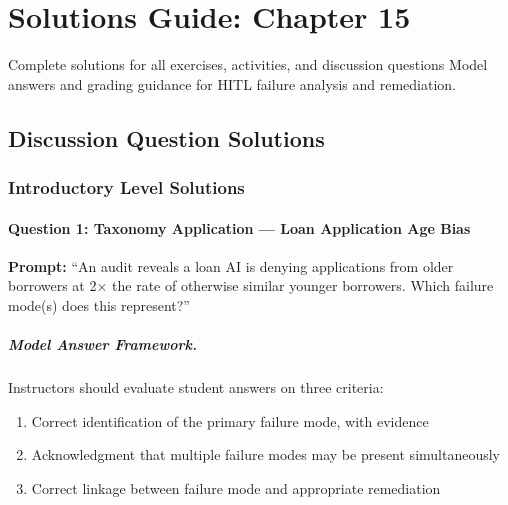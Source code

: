 
\chapter{Solutions Guide: Chapter 15}
\label{ch:solutions-ch15}

\begin{chapterquote}{Complete solutions for all exercises, activities, and discussion questions}
Model answers and grading guidance for HITL failure analysis and remediation.
\end{chapterquote}

\section{Discussion Question Solutions}

\subsection{Introductory Level Solutions}

\subsubsection{Question 1: Taxonomy Application --- Loan Application Age Bias}

\textbf{Prompt:} ``An audit reveals a loan AI is denying applications from older borrowers at 2$\times$ the rate of otherwise similar younger borrowers. Which failure mode(s) does this represent?''

\paragraph{Model Answer Framework.}

Instructors should evaluate student answers on three criteria:
\begin{enumerate}
    \item Correct identification of the primary failure mode, with evidence
    \item Acknowledgment that multiple failure modes may be present simultaneously
    \item Correct linkage between failure mode and appropriate remediation
\end{enumerate}

